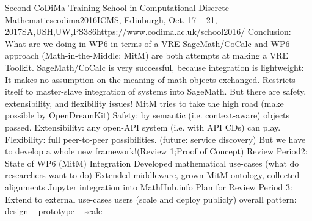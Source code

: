 \begin{Aim 1}
\begin{Aim 2}
\begin{event}{Second CoDiMa Training School in Computational Discrete Mathematics}{codima2016}{ICMS, Edinburgh, Oct. 17 -- 21, 2017}{SA,USH,UW,PS}{38}{6}{https://www.codima.ac.uk/school2016/}
Conclusion: What are we doing in WP6 in terms of a VRE
SageMath/CoCalc and WP6 approach (Math-in-the-Middle; MitM) are both attempts at making a VRE Toolkit.
SageMath/CoCalc is very successful, because integration is lightweight:
It makes no assumption on the meaning of math objects exchanged.
Restricts itself to master-slave integration of systems into SageMath.
But there are safety, extensibility, and flexibility issues!
MitM tries to take the high road (make possible by OpenDreamKit)
Safety: by semantic (i.e. context-aware) objects passed.
Extensibility: any open-API system (i.e. with API CDs) can play.
Flexibility: full peer-to-peer possibilities.
(future: service discovery)
But we have to develop a whole new framework!(Review 1;Proof of Concept)
Review Period2: State of WP6 (MitM) Integration
Developed mathematical use-cases (what do researchers want to do)
Extended middleware, grown MitM ontology, collected alignments
Jupyter integration into MathHub.info
Plan for Review Period 3: Extend to external use-cases users  (scale and deploy publicly)
overall pattern: design – prototype – scale


\end{event}
\end{Aim 2}
\end{Aim 1}
